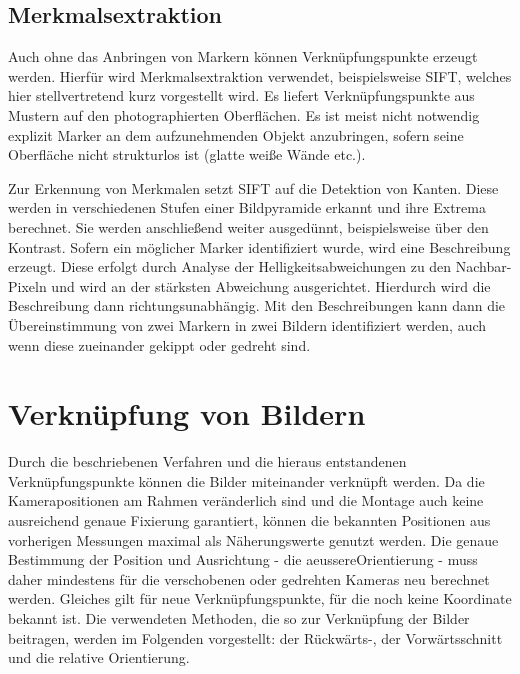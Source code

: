 \documentclass[./00PhotoBox.tex]{subfiles}
\begin{document}
\subsection{Merkmalsextraktion}
\label{ss:sift}
Auch ohne das Anbringen von Markern können Verknüpfungspunkte erzeugt werden. Hierfür wird Merkmalsextraktion verwendet, beispielsweise \Gls{SIFT}, welches hier stellvertretend kurz vorgestellt wird. Es liefert Verknüpfungspunkte aus Mustern auf den photographierten Oberflächen. Es ist meist nicht notwendig explizit Marker an dem aufzunehmenden Objekt anzubringen, sofern seine Oberfläche nicht strukturlos ist (glatte weiße Wände etc.).

Zur Erkennung von Merkmalen setzt \gls{SIFT} auf die Detektion von Kanten. Diese werden in verschiedenen Stufen einer Bildpyramide erkannt und ihre Extrema berechnet. Sie werden anschließend weiter ausgedünnt, beispielsweise über den Kontrast. Sofern ein möglicher Marker identifiziert wurde, wird eine Beschreibung erzeugt. Diese erfolgt  durch Analyse der Helligkeitsabweichungen zu den Nachbar-Pixeln und wird an der stärksten Abweichung ausgerichtet. Hierdurch wird die Beschreibung dann richtungsunabhängig. Mit den Beschreibungen kann dann die Übereinstimmung von zwei Markern in zwei Bildern identifiziert werden, auch wenn diese zueinander gekippt oder gedreht sind.
\citep[S. 484f]{luhmann}

\section{Verknüpfung von Bildern}
\label{s:photogramm}
Durch die beschriebenen Verfahren und die hieraus entstandenen Verknüpfungs\-punkte können die Bilder miteinander verknüpft werden. Da die Kamerapositionen am Rahmen veränderlich sind und die Montage auch keine ausreichend genaue Fixierung garantiert, können die bekannten Positionen aus vorherigen Messungen maximal als Näherungswerte genutzt werden. Die genaue Bestimmung der Position und Ausrichtung - die \gls{aeussereOrientierung} - muss daher mindestens für die verschobenen oder gedrehten Kameras neu berechnet werden. Gleiches gilt für neue Verknüpfungspunkte, für die noch keine Koordinate bekannt ist. Die verwendeten Methoden, die so zur Verknüpfung der Bilder beitragen, werden im Folgenden vorgestellt: der Rückwärts-, der Vorwärtsschnitt und die relative Orientierung.
\end{document}
